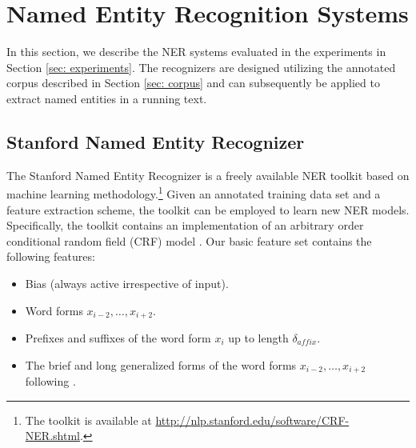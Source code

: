 \documentclass[11pt]{article}
\begin{document}



\section{Named Entity Recognition Systems}
\label{sec: named entity recognizers}

In this section, we describe the NER systems evaluated in the experiments in Section \ref{sec: experiments}. The recognizers are designed utilizing the annotated corpus described in Section \ref{sec: corpus} and can subsequently be applied to extract named entities in a running text. 

\subsection{Stanford Named Entity Recognizer}

The Stanford Named Entity Recognizer is a freely available NER toolkit based on machine learning methodology.\footnote{The toolkit is available at \url{http://nlp.stanford.edu/software/CRF-NER.shtml}.} Given an annotated training data set and a feature extraction scheme, the toolkit can be employed to learn new NER models. Specifically, the toolkit contains an implementation of an arbitrary order conditional random field (CRF) model \citep{lafferty2001,finkel2005}. Our basic feature set contains the following features:

\begin{itemize}
\item[1.] Bias (always active irrespective of input).
\item[2.] Word forms $x_{i-2}, \dots, x_{i+2}$.
\item[3.] Prefixes and suffixes of the word form $x_i$ up to length $\delta_{affix}$.
\item[4.] The brief and long generalized forms of the word forms $x_{i-2}, \dots, x_{i+2}$ following \citet{collins2002}.
\end{itemize}
\end{document}
